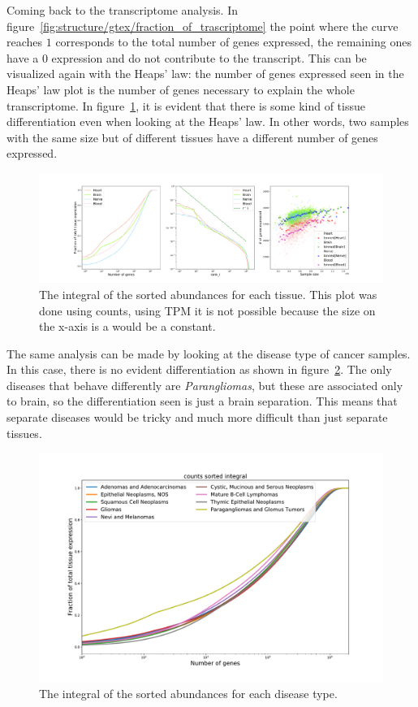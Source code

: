 Coming back to the transcriptome analysis. In figure~\ref{fig:structure/gtex/fraction_of_trascriptome} the point where the curve reaches $1$ corresponds to the total number of genes expressed, the remaining ones have a $0$ expression and do not contribute to the transcript. This can be visualized again with the Heaps' law: the number of genes expressed seen in the Heaps' law plot is the number of genes necessary to explain the whole transcriptome. In figure~\ref{fig:structure/gtex/heaps_tissue}, it is evident that there is some kind of tissue differentiation even when looking at the Heaps' law. In other words, two samples with the same size but of different tissues have a different number of genes expressed.
\begin{figure}[htb!]
  \centering
  \includegraphics[width=0.5\linewidth]{pictures/structure/gtex/heaps_tissue.pdf}
  \caption{The integral of the sorted abundances for each tissue. This plot was done using counts, using TPM it is not possible because the size on the x-axis is a would be a constant.}
  \label{fig:structure/gtex/heaps_tissue}
\end{figure}
The same analysis can be made by looking at the disease type of cancer samples. In this case, there is no evident differentiation as shown in figure~\ref{fig:structure/tcga/fraction_of_trascriptome_disease}. The only diseases that behave differently are \textit{Parangliomas}, but these are associated only to brain, so the differentiation seen is just a brain separation. This means that separate diseases would be tricky and much more difficult than just separate tissues.
\begin{figure}[htb!]
  \centering
  \includegraphics[width=0.8\linewidth]{pictures/structure/tcga/fraction_of_trascriptome_disease.pdf}
  \caption{The integral of the sorted abundances for each disease type.}
  \label{fig:structure/tcga/fraction_of_trascriptome_disease}
\end{figure}

